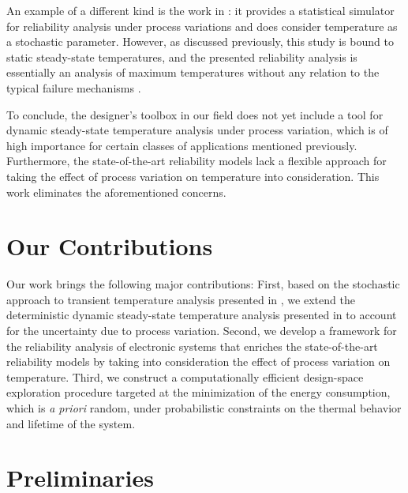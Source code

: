 An example of a different kind is the work in \cite{lee2013}: it provides a
statistical simulator for reliability analysis under process variations and does
consider temperature as a stochastic parameter. However, as discussed
previously, this study is bound to static steady-state temperatures, and the
presented reliability analysis is essentially an analysis of maximum
temperatures without any relation to the typical failure mechanisms
\cite{jedec2016}.

To conclude, the designer's toolbox in our field does not yet include a tool for
dynamic steady-state temperature analysis under process variation, which is of
high importance for certain classes of applications mentioned previously.
Furthermore, the state-of-the-art reliability models lack a flexible approach
for taking the effect of process variation on temperature into consideration.
This work eliminates the aforementioned concerns.

\section{Our Contributions}

Our work brings the following major contributions:
First, based on the stochastic approach to transient temperature analysis
presented in \cite{ukhov2014b}, we extend the deterministic dynamic steady-state
temperature analysis presented in \cite{ukhov2012} to account for the
uncertainty due to process variation. Second, we develop a framework for the
reliability analysis of electronic systems that enriches the state-of-the-art
reliability models by taking into consideration the effect of process variation
on temperature. Third, we construct a computationally efficient design-space
exploration procedure targeted at the minimization of the energy consumption,
which is \emph{a priori} random, under probabilistic constraints on the thermal
behavior and lifetime of the system.

\section{Preliminaries}

